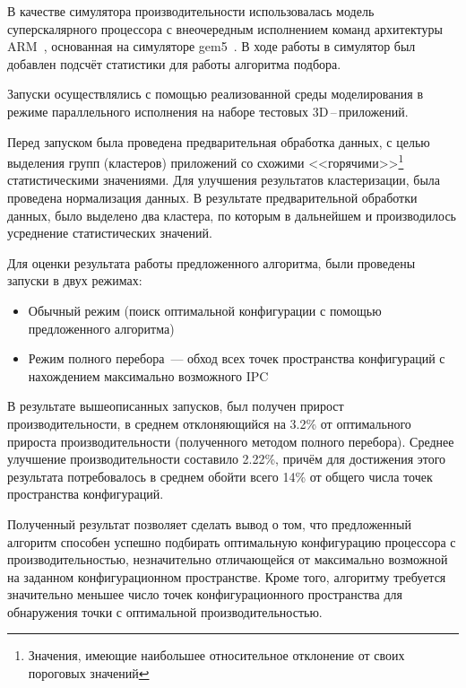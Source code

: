 
В качестве симулятора производительности использовалась модель суперскалярного процессора с внеочередным исполнением команд архитектуры ARM~\cite{seal2001arm}, основанная на симуляторе gem5~\cite{binkert2011gem5}. В ходе работы в симулятор был добавлен подсчёт статистики для работы алгоритма подбора.

Запуски осуществлялись с помощью реализованной среды моделирования в режиме параллельного исполнения на наборе тестовых 3D\,--\,приложений.

Перед запуском была проведена предварительная обработка данных, с целью выделения групп (кластеров) приложений со схожими <<горячими>>\footnote{Значения, имеющие наибольшее относительное отклонение от своих пороговых значений} статистическими значениями. Для улучшения результатов кластеризации, была проведена нормализация данных. В результате предварительной обработки данных, было выделено два кластера, по которым в дальнейшем и производилось усреднение статистических значений.

Для оценки результата работы предложенного алгоритма, были проведены запуски в двух режимах:
\begin{itemize}
  \item Обычный режим (поиск оптимальной конфигурации с помощью предложенного алгоритма)
  \item Режим полного перебора~--- обход всех точек пространства конфигураций с нахождением максимально возможного IPC
\end{itemize}

В результате вышеописанных запусков, был получен прирост производительности, в среднем отклоняющийся на 3.2\% от оптимального прироста производительности (полученного методом полного перебора). Среднее улучшение производительности составило 2.22\%, причём для достижения этого результата потребовалось в среднем обойти всего 14\% от общего числа точек пространства конфигураций.

Полученный результат позволяет сделать вывод о том, что предложенный алгоритм способен успешно подбирать оптимальную конфигурацию процессора с производительностью, незначительно отличающейся от максимально возможной на заданном конфигурационном пространстве. Кроме того, алгоритму требуется значительно меньшее число точек конфигурационного пространства для обнаружения точки с оптимальной производительностью.
